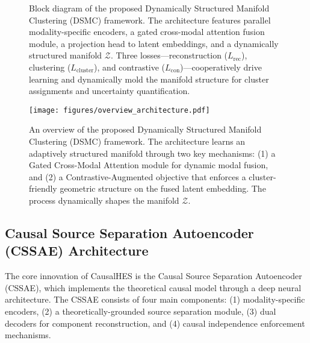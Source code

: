 \documentclass[journal]{IEEEtran}
\begin{document}
\begin{figure*}[ht]
{
}
\caption{Block diagram of the proposed Dynamically Structured Manifold Clustering (DSMC) framework. The architecture features parallel modality-specific encoders, a gated cross-modal attention fusion module, a projection head to latent embeddings, and a dynamically structured manifold $\mathcal{Z}$. Three losses—reconstruction ($L_\mathrm{rec}$), clustering ($L_\mathrm{cluster}$), and contrastive ($L_\mathrm{con}$)—cooperatively drive learning and dynamically mold the manifold structure for cluster assignments and uncertainty quantification.}
\end{figure*}

\begin{figure}[!t]
\centering
\texttt{[image: figures/overview\_architecture.pdf]} %
\caption{An overview of the proposed Dynamically Structured Manifold Clustering (DSMC) framework. The architecture learns an adaptively structured manifold through two key mechanisms: (1) a Gated Cross-Modal Attention module for dynamic modal fusion, and (2) a Contrastive-Augmented objective that enforces a cluster-friendly geometric structure on the fused latent embedding. The process dynamically shapes the manifold $\mathcal{Z}$.}
\label{fig:overview}
\end{figure}

\subsection{Causal Source Separation Autoencoder (CSSAE) Architecture}

The core innovation of CausalHES is the Causal Source Separation Autoencoder (CSSAE), which implements the theoretical causal model through a deep neural architecture. The CSSAE consists of four main components: (1) modality-specific encoders, (2) a theoretically-grounded source separation module, (3) dual decoders for component reconstruction, and (4) causal independence enforcement mechanisms.
\end{document}
